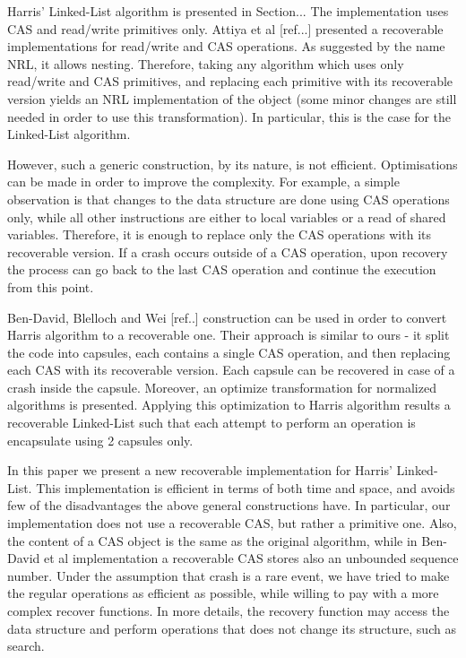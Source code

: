 Harris' Linked-List algorithm is presented in Section... The implementation uses CAS and read/write primitives only.
Attiya et al [ref...] presented a recoverable implementations for read/write and CAS operations. As suggested by the name NRL, it allows nesting. Therefore, taking any algorithm which uses only read/write and CAS primitives, and replacing each primitive with its recoverable version yields an NRL implementation of the object (some minor changes are still needed in order to use this transformation). In particular, this is the case for the Linked-List algorithm.

However, such a generic construction, by its nature, is not efficient. Optimisations can be made in order to improve the complexity. For example, a simple observation is that changes to the data structure are done using CAS operations only, while all other instructions are either to local variables or a read of shared variables. Therefore, it is enough to replace only the CAS operations with its recoverable version. If a crash occurs outside of a CAS operation, upon recovery the process can go back to the last CAS operation and continue the execution from this point. 

Ben-David, Blelloch and Wei [ref..] construction can be used in order to convert Harris algorithm to a recoverable one. Their approach is similar to ours - it split the code into capsules, each contains a single CAS operation, and then replacing each CAS with its recoverable version. Each capsule can be recovered in case of a crash inside the capsule. Moreover, an optimize transformation for normalized algorithms is presented. Applying this optimization to Harris algorithm results a recoverable Linked-List such that each attempt to perform an operation is encapsulate using 2 capsules only.

In this paper we present a new recoverable implementation for Harris' Linked-List. This implementation is efficient in terms of both time and space, and avoids few of the disadvantages the above general constructions have. In particular, our implementation does not use a recoverable CAS, but rather a primitive one. Also, the content of a CAS object is the same as the original algorithm, while in Ben-David et al implementation a recoverable CAS stores also an unbounded sequence number. Under the assumption that crash is a rare event, we have tried to make the regular operations as efficient as possible, while willing to pay with a more complex recover functions. In more details, the recovery function may access the data structure and perform operations that does not change its structure, such as search.

